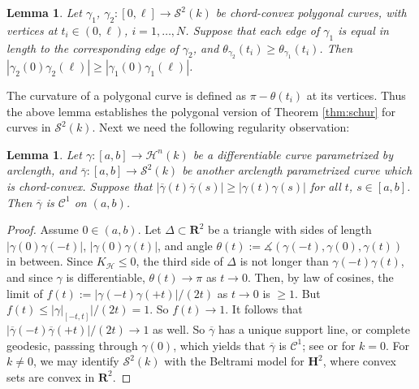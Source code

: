 \documentclass[11pt]{amsart}
\newtheorem{lemma}[theorem]{Lemma}
\theoremstyle{definition}
\newcommand{\ol}{\overline}
\newcommand{\R}{\mathbf{R}}
\newcommand{\C}{\mathcal{C}}
\begin{document}
\begin{lemma}\label{prop:polyschur}
Let $\gamma_1$, $\gamma_2\colon [0,\ell]\to\mathcal{S}^2(k)$ be chord-convex polygonal curves, with vertices at $t_i\in (0,\ell)$, $i=1,\dots, N$. Suppose that each edge of $\gamma_1$ is equal in length to the corresponding edge of $\gamma_2$, and $\theta_{\gamma_2}(t_i)\geq\theta_{\gamma_1}(t_i)$.  Then $|\gamma_2(0)\gamma_2(\ell)|\geq |\gamma_1(0)\gamma_1(\ell)|$.
\end{lemma}


The curvature of a polygonal curve is defined as $\pi-\theta(t_i)$ at its vertices. Thus the above lemma establishes the polygonal version of Theorem \ref{thm:schur} for curves in $\mathcal{S}^2(k)$. Next we need the following regularity observation:

\begin{lemma}\label{lem:C1}
Let $\gamma\colon[a,b]\to\mathcal{H}^n(k)$ be a differentiable curve parametrized by arclength, and $\ol\gamma\colon [a,b]\to\mathcal{S}^2(k)$ be another arclength parametrized curve which is chord-convex. Suppose that $|\ol\gamma(t)\ol\gamma(s)|\geq |\gamma(t)\gamma(s)|$ for all $t$, $s\in[a,b]$.
Then $\ol\gamma$ is $\C^1$ on $(a,b)$.
\end{lemma}
\begin{proof}
Assume $0\in(a,b)$. Let $\Delta\subset\R^2$ be a triangle with sides of length $|\gamma(0)\gamma(-t)|$, $|\gamma(0)\gamma(t)|$, and angle $\theta(t):=\measuredangle(\gamma(-t),\gamma(0),\gamma(t))$ in between. Since $K_\mathcal{H}\leq 0$, the third side of $\Delta$ is not longer than $\gamma(-t)\gamma(t)$, and since $\gamma$ is differentiable, $\theta(t)\to\pi$ as $t\to 0$. Then, by law of cosines, the limit of $f(t):=|\gamma(-t)\gamma(+t)|/(2t)$ as $t\to 0$ is $\geq 1$. But $f(t)\leq |\gamma|_{[-t,t]}|/(2t)= 1$. So $f(t)\to 1$. It follows that $|\ol\gamma(-t)\ol\gamma(+t)|/(2t)\to1$ as well. So $\ol\gamma$ has a unique support line, or complete geodesic, passsing through $\gamma(0)$, which yields that
$\ol\gamma$ is $\C^1$; see  \cite[Thm. 1.2]{ghomi-howard2014} or \cite[Thm. 1.5.4]{schneider2014} for $k=0$. For $k\neq 0$, we may identify $\mathcal{S}^2(k)$ with the Beltrami model for $\textbf{H}^2$, where convex sets are convex in $\R^2$.
\end{proof}
\end{document}
